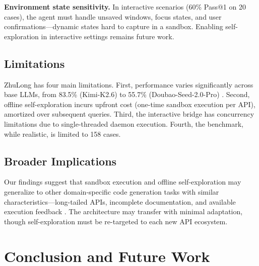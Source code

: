 \documentclass[anonymous, sigconf]{acmart}
\begin{document}
\textbf{Environment state sensitivity.} In interactive scenarios (60\% Pass@1 on 20 cases), the agent must handle unsaved windows, focus states, and user confirmations—dynamic states hard to capture in a sandbox. Enabling self-exploration in interactive settings remains future work.

\subsection{Limitations}

ZhuLong has four main limitations. First, performance varies significantly across base LLMs, from 83.5\% (Kimi-K2.6) to 55.7\% (Doubao-Seed-2.0-Pro) \cite{sharifloo2025struggle}. Second, offline self-exploration incurs upfront cost (one-time sandbox execution per API), amortized over subsequent queries. Third, the interactive bridge has concurrency limitations due to single-threaded daemon execution. Fourth, the benchmark, while realistic, is limited to 158 cases.

\subsection{Broader Implications}

Our findings suggest that sandbox execution and offline self-exploration may generalize to other domain-specific code generation tasks with similar characteristics—long-tailed APIs, incomplete documentation, and available execution feedback \cite{kumar2026agentforge}. The architecture may transfer with minimal adaptation, though self-exploration must be re-targeted to each new API ecosystem.

\section{Conclusion and Future Work}
\label{sec:conclusion}
\end{document}
